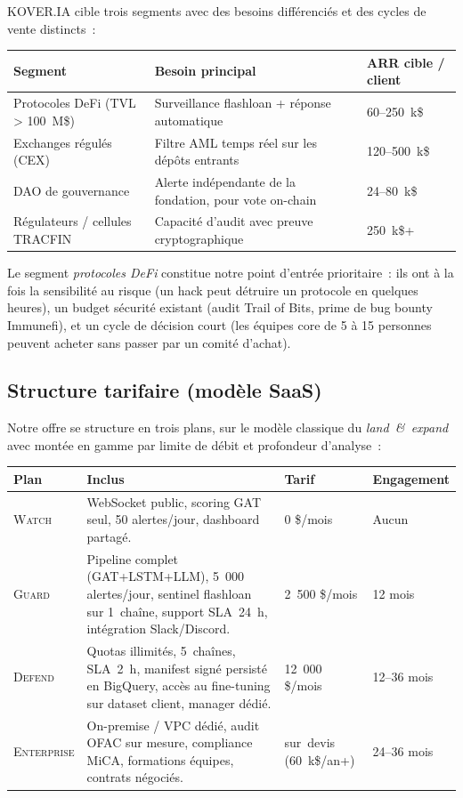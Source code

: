 \documentclass[11pt,a4paper]{article}
\begin{document}
\textsc{KOVER.IA} cible trois segments avec des besoins différenciés et
des cycles de vente distincts~:

\begin{tabularx}{\linewidth}{@{}lXl@{}}
\toprule
\textbf{Segment} & \textbf{Besoin principal} & \textbf{ARR cible / client} \\
\midrule
Protocoles DeFi (TVL > 100~M\$) & Surveillance flashloan + réponse automatique & 60--250~k\$ \\
Exchanges régulés (CEX) & Filtre AML temps réel sur les dépôts entrants & 120--500~k\$ \\
DAO de gouvernance & Alerte indépendante de la fondation, pour vote on-chain & 24--80~k\$ \\
Régulateurs / cellules TRACFIN & Capacité d'audit avec preuve cryptographique & 250~k\$+ \\
\bottomrule
\end{tabularx}

\medskip

Le segment \emph{protocoles DeFi} constitue notre point d'entrée
prioritaire~: ils ont à la fois la sensibilité au risque (un hack peut
détruire un protocole en quelques heures), un budget sécurité existant
(audit Trail of Bits, prime de bug bounty Immunefi), et un cycle de
décision court (les équipes core de 5 à 15 personnes peuvent acheter
sans passer par un comité d'achat).

\subsection{Structure tarifaire (modèle SaaS)}

Notre offre se structure en trois plans, sur le modèle classique du
\emph{land~\&~expand} avec montée en gamme par limite de débit et
profondeur d'analyse~:

\begin{tabularx}{\linewidth}{@{}lXll@{}}
\toprule
\textbf{Plan} & \textbf{Inclus} & \textbf{Tarif} & \textbf{Engagement} \\
\midrule
\textsc{Watch} &
WebSocket public, scoring GAT seul, 50 alertes/jour, dashboard partagé.
& 0 \$/mois & Aucun \\
\addlinespace
\textsc{Guard} &
Pipeline complet (GAT+LSTM+LLM), 5~000 alertes/jour, sentinel flashloan
sur 1~chaîne, support SLA~24~h, intégration Slack/Discord. &
2~500 \$/mois & 12 mois \\
\addlinespace
\textsc{Defend} &
Quotas illimités, 5~chaînes, SLA~2~h, manifest signé persisté en
BigQuery, accès au fine-tuning sur dataset client, manager dédié. &
12~000 \$/mois & 12--36 mois \\
\addlinespace
\textsc{Enterprise} &
On-premise / VPC dédié, audit OFAC sur mesure, compliance MiCA, formations
équipes, contrats négociés. &
sur~devis \linebreak (60~k\$/an+) & 24--36 mois \\
\bottomrule
\end{tabularx}
\end{document}
